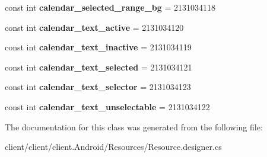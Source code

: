 \begin{DoxyCompactItemize}
\item 
\hypertarget{classclient_1_1Droid_1_1Resource_1_1Color_a2d0a8be690db7bd467a77279c73404bd}{const int {\bfseries calendar\-\_\-selected\-\_\-range\-\_\-bg} = 2131034118}\label{classclient_1_1Droid_1_1Resource_1_1Color_a2d0a8be690db7bd467a77279c73404bd}

\item 
\hypertarget{classclient_1_1Droid_1_1Resource_1_1Color_ac2e368bc995e04cfb4cdea60826cdaa7}{const int {\bfseries calendar\-\_\-text\-\_\-active} = 2131034120}\label{classclient_1_1Droid_1_1Resource_1_1Color_ac2e368bc995e04cfb4cdea60826cdaa7}

\item 
\hypertarget{classclient_1_1Droid_1_1Resource_1_1Color_a96ad5f8118faf1e38e409a586e6621dd}{const int {\bfseries calendar\-\_\-text\-\_\-inactive} = 2131034119}\label{classclient_1_1Droid_1_1Resource_1_1Color_a96ad5f8118faf1e38e409a586e6621dd}

\item 
\hypertarget{classclient_1_1Droid_1_1Resource_1_1Color_a6bb63dbcd298e38f8b8bebda75a2ac84}{const int {\bfseries calendar\-\_\-text\-\_\-selected} = 2131034121}\label{classclient_1_1Droid_1_1Resource_1_1Color_a6bb63dbcd298e38f8b8bebda75a2ac84}

\item 
\hypertarget{classclient_1_1Droid_1_1Resource_1_1Color_ac39137bd5c7c8fa37b2328ac46afd509}{const int {\bfseries calendar\-\_\-text\-\_\-selector} = 2131034123}\label{classclient_1_1Droid_1_1Resource_1_1Color_ac39137bd5c7c8fa37b2328ac46afd509}

\item 
\hypertarget{classclient_1_1Droid_1_1Resource_1_1Color_a0bcd6582ca8e22231df6ba95f796a477}{const int {\bfseries calendar\-\_\-text\-\_\-unselectable} = 2131034122}\label{classclient_1_1Droid_1_1Resource_1_1Color_a0bcd6582ca8e22231df6ba95f796a477}

\end{DoxyCompactItemize}


The documentation for this class was generated from the following file\-:\begin{DoxyCompactItemize}
\item 
client/client/client.\-Android/\-Resources/Resource.\-designer.\-cs\end{DoxyCompactItemize}
